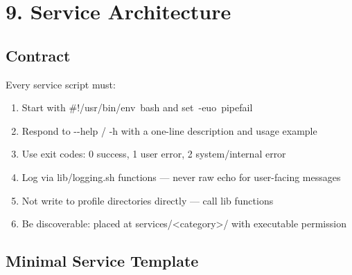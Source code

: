 \documentclass[11pt, a4paper, DIV=14]{scrartcl}
\renewcommand{\texttt}[1]{{\ttfamily\fontsize{8.5}{10.5}\selectfont\color{BabbNavy}#1}}
\let\origRule\rule
\renewcommand{\rule}[2]{\par\vspace{2pt}\noindent{\color{BabbBorder}\origRule[0pt]{#1}{#2}}\par\vspace{2pt}}
\begin{document}
\begin{center}\rule{0.5\linewidth}{0.5pt}\end{center}

\section{9. Service Architecture}\label{service-architecture}

\subsection{Contract}\label{contract}

Every service script must:

\begin{enumerate}
\def\labelenumi{\arabic{enumi}.}
\tightlist
\item
  Start with \texttt{\#!/usr/bin/env\ bash} and
  \texttt{set\ -euo\ pipefail}
\item
  Respond to \texttt{-\/-help} / \texttt{-h} with a one-line description
  and usage example
\item
  Use exit codes: \texttt{0} success, \texttt{1} user error, \texttt{2}
  system/internal error
\item
  Log via \texttt{lib/logging.sh} functions --- never raw \texttt{echo}
  for user-facing messages
\item
  Not write to profile directories directly --- call lib functions
\item
  Be discoverable: placed at
  \texttt{services/\textless{}category\textgreater{}/} with executable
  permission
\end{enumerate}

\subsection{Minimal Service Template}\label{minimal-service-template}
\end{document}
